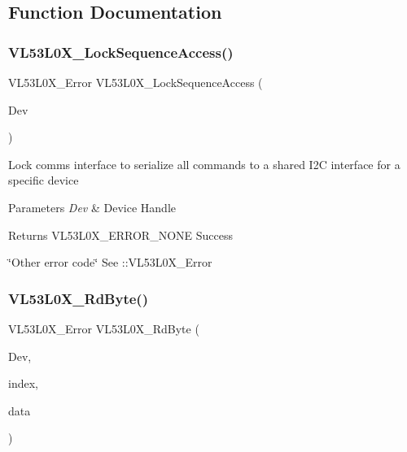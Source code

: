 \subsection{Function Documentation}
\mbox{\label{group__VL53L0X__registerAccess__group_gadec2e01eacfb71e35303673dba4c525a}} 
\subsubsection{\texorpdfstring{V\+L53\+L0\+X\+\_\+\+Lock\+Sequence\+Access()}{VL53L0X\_LockSequenceAccess()}}
{\footnotesize\ttfamily V\+L53\+L0\+X\+\_\+\+Error V\+L53\+L0\+X\+\_\+\+Lock\+Sequence\+Access (\begin{DoxyParamCaption}\item[{\hyperlink{group__VL53L0X__platform__group_ga2d6405308b1dd524b462f1b8fb97d167}{V\+L53\+L0\+X\+\_\+\+D\+EV}}]{Dev }\end{DoxyParamCaption})}

Lock comms interface to serialize all commands to a shared I2C interface for a specific device 
\begin{DoxyParams}{Parameters}
{\em Dev} & Device Handle \\
\hline
\end{DoxyParams}
\begin{DoxyReturn}{Returns}
V\+L53\+L0\+X\+\_\+\+E\+R\+R\+O\+R\+\_\+\+N\+O\+NE Success 

\char`\"{}\+Other error code\char`\"{} See \+::\+V\+L53\+L0\+X\+\_\+\+Error 
\end{DoxyReturn}
\mbox{\label{group__VL53L0X__registerAccess__group_gaab280eabdced8065bc4fb99e221e12f9}} 
\subsubsection{\texorpdfstring{V\+L53\+L0\+X\+\_\+\+Rd\+Byte()}{VL53L0X\_RdByte()}}
{\footnotesize\ttfamily V\+L53\+L0\+X\+\_\+\+Error V\+L53\+L0\+X\+\_\+\+Rd\+Byte (\begin{DoxyParamCaption}\item[{\hyperlink{group__VL53L0X__platform__group_ga2d6405308b1dd524b462f1b8fb97d167}{V\+L53\+L0\+X\+\_\+\+D\+EV}}]{Dev,  }\item[{\hyperlink{vl53l0x__types_8h_aba7bc1797add20fe3efdf37ced1182c5}{uint8\+\_\+t}}]{index,  }\item[{\hyperlink{vl53l0x__types_8h_aba7bc1797add20fe3efdf37ced1182c5}{uint8\+\_\+t} $\ast$}]{data }\end{DoxyParamCaption})}


